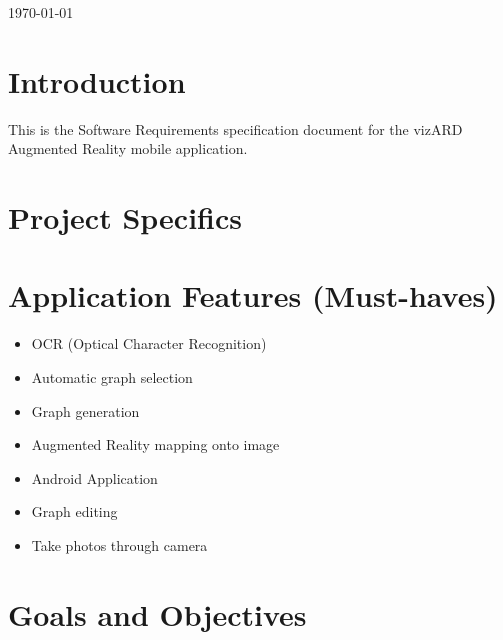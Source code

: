 \documentclass[a4paper,12pt]{article}
\begin{document}
\begin{titlepage}

{\large \today}\\[3cm] %

 

\vfill %

\end{titlepage}

\newpage

\tableofcontents

\newpage

\section{Introduction}

This is the Software Requirements specification document for the vizARD Augmented Reality mobile application.

\newpage
\section{Project Specifics} %

\section{Application Features (Must-haves)} %
\begin{itemize}
	\item OCR (Optical Character Recognition)
	\item Automatic graph selection
	\item Graph generation
	\item Augmented Reality mapping onto image
	\item Android Application
	\item Graph editing
	\item Take photos through camera
\end{itemize}

\newpage
\section{Goals and Objectives} %
\end{document}
